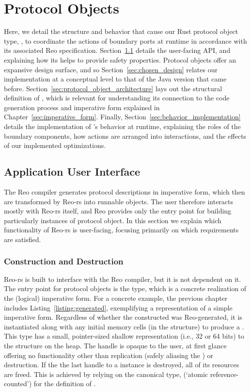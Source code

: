 \section{Protocol Objects}
\label{sec:protocol_objects}
Here, we detail the structure and behavior that cause our Rust protocol object type, , to coordinate the actions of boundary ports at runtime in accordance with its associated Reo specification. Section~\ref{sec:user_facing} details the user-facing API, and explaining how its helps to provide safety properties. Protocol objects offer an expansive design surface, and so Section~\ref{sec:chosen_design} relates our implementation at a conceptual level to that of the Java version that came before. Section~\ref{sec:protocol_object_architecture} lays out the structural definition of , which is relevant for understanding its connection to the code generation process and imperative form explained in Chapter~\ref{sec:imperative_form}. Finally, Section~\ref{sec:behavior_implementation} details the implementation of 's behavior at runtime, explaining the roles of the boundary components, how actions are arranged into interactions, and the effects of our implemented optimizations.

\subsection{Application User Interface}
\label{sec:user_facing}
The Reo compiler generates protocol descriptions in imperative form, which then are transformed by Reo-rs into runnable objects. The user therefore interacts mostly with Reo-rs itself, and Reo provides only the entry point for building particularly instances of protocol object. In this section we explain which functionality of Reo-rs is user-facing, focusing primarily on which requirements are satisfied.


\subsubsection{Construction and Destruction}
\label{sec:construction_and_destruction}
Reo-rs is built to interface with the Reo compiler, but it is not dependent on it. The entry point for protocol objects is the  type, which is a concrete realization of the (logical) imperative form. For a concrete example, the previous chapter includes Listing~\ref{listing:generated}, exemplifying a  representation of a simple imperative form. Regardless of whether the constructed  was Reo-generated, it is instantiated along with any initial memory cells (in the  structure) to produce a . This type has a small, pointer-sized shallow representation (i.e., 32 or 64 bits) to the  structure on the heap. The handle is opaque to the user, at first glance offering no functionality other than replication (safely aliasing the ) or destruction. If the the last handle to a  instance is destroyed, all of its resources are freed. This is achieved by relying on the canonical  type, (`atomic reference-counted') for the definition of .

